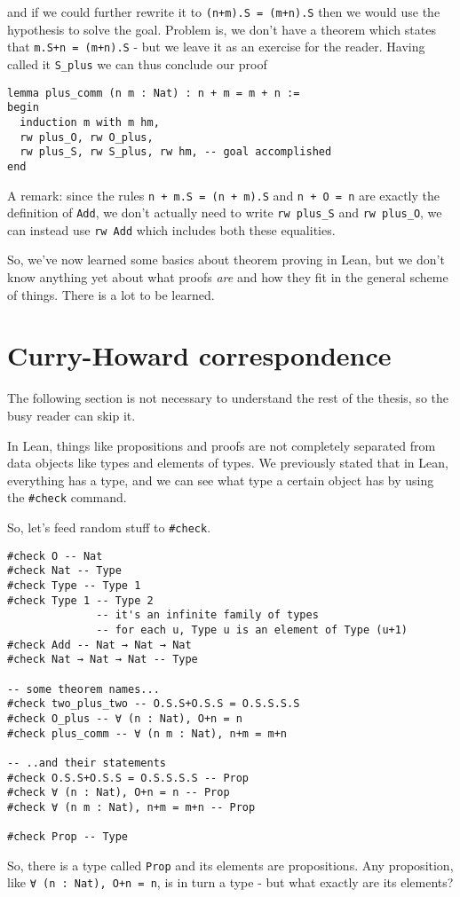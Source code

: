 \documentclass{book}
\theoremstyle{definition}
\theoremstyle{remark}
\theoremstyle{plain}
\begin{document}
and if we could further rewrite it to \lstinline{(n+m).S = (m+n).S} then we would use the hypothesis
to solve the goal.
Problem is, we don't have a theorem which states that \lstinline{m.S+n = (m+n).S} - but we leave it as an exercise for the reader.
Having called it \lstinline{S_plus} we can thus conclude our proof
\begin{lstlisting}
lemma plus_comm (n m : Nat) : n + m = m + n :=
begin
  induction m with m hm,
  rw plus_O, rw O_plus,
  rw plus_S, rw S_plus, rw hm, -- goal accomplished
end
\end{lstlisting}
A remark: since the rules \lstinline{n + m.S = (n + m).S} and \lstinline{n + O = n} are exactly the definition of \lstinline{Add},
we don't actually need to write \lstinline{rw plus_S} and \lstinline{rw plus_O}, we can instead use \lstinline{rw Add}
which includes both these equalities.

So, we've now learned some basics about theorem proving in Lean,
but we don't know anything yet about what proofs \textit{are} and how they fit in the general scheme of things.
There is a lot to be learned.

\section{Curry-Howard correspondence}

The following section is not necessary to understand the rest of the thesis,
so the busy reader can skip it.

In Lean, things like propositions and proofs are not completely separated from data objects like types and elements of types.
We previously stated that in Lean, everything has a type, and we can see what type a certain object has by using the \lstinline{#check} command.

So, let's feed random stuff to \lstinline{#check}.
\begin{lstlisting}
#check O -- Nat
#check Nat -- Type
#check Type -- Type 1
#check Type 1 -- Type 2
              -- it's an infinite family of types
              -- for each u, Type u is an element of Type (u+1)
#check Add -- Nat → Nat → Nat
#check Nat → Nat → Nat -- Type

-- some theorem names...
#check two_plus_two -- O.S.S+O.S.S = O.S.S.S.S
#check O_plus -- ∀ (n : Nat), O+n = n
#check plus_comm -- ∀ (n m : Nat), n+m = m+n

-- ..and their statements
#check O.S.S+O.S.S = O.S.S.S.S -- Prop
#check ∀ (n : Nat), O+n = n -- Prop
#check ∀ (n m : Nat), n+m = m+n -- Prop

#check Prop -- Type
\end{lstlisting}
So, there is a type called \lstinline{Prop} and its elements are propositions.
Any proposition, like \lstinline{∀ (n : Nat), O+n = n}, is in turn a type - but what exactly are its elements?
\end{document}
